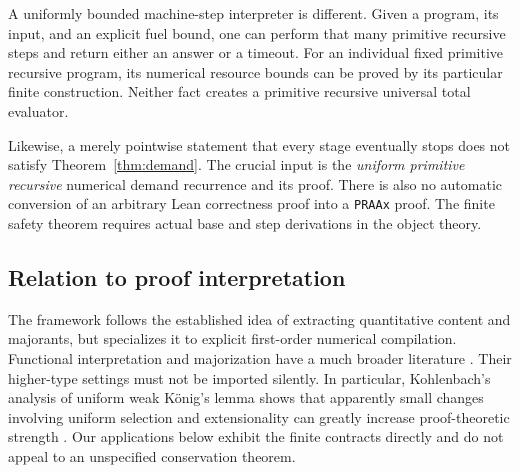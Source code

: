 A uniformly bounded machine-step interpreter is different. Given a
program, its input, and an explicit fuel bound, one can perform that many
primitive recursive steps and return either an answer or a timeout. For
an individual fixed primitive recursive program, its numerical resource
bounds can be proved by its particular finite construction. Neither fact
creates a primitive recursive universal total evaluator.

Likewise, a merely pointwise statement that every stage eventually stops
does not satisfy Theorem~\ref{thm:demand}. The crucial input is the
\emph{uniform primitive recursive} numerical demand recurrence and its
proof. There is also no automatic conversion of an arbitrary Lean
correctness proof into a \texttt{PRAAx} proof. The finite safety theorem
requires actual base and step derivations in the object theory.

\subsection{Relation to proof interpretation}

The framework follows the established idea of extracting quantitative
content and majorants, but specializes it to explicit first-order
numerical compilation. Functional interpretation and majorization have a
much broader literature \cite{kohlenbach-notes,kohlenbach-point}. Their
higher-type settings must not be imported silently. In particular,
Kohlenbach's analysis of uniform weak K\"onig's lemma shows that apparently
small changes involving uniform selection and extensionality can greatly
increase proof-theoretic strength \cite{kohlenbach-uwkl}. Our applications
below exhibit the finite contracts directly and do not appeal to an
unspecified conservation theorem.
